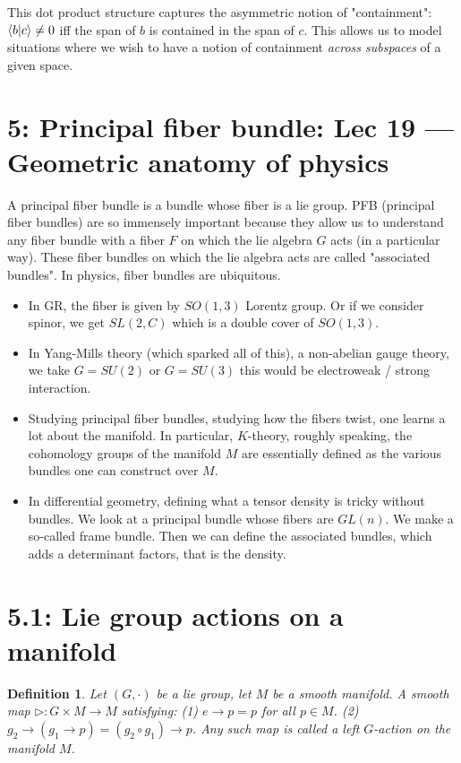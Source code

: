 \documentclass[11pt]{book}
\newtheorem{definition}[theorem]{Definition}
\begin{document}
This dot product structure captures the asymmetric notion of "containment":
$\braket{b}{c} \neq 0$ iff the span of $b$ is contained in the span of $c$.
This allows us to model situations where we wish to have a notion of containment
\emph{across subspaces} of a given space.

\section{5: Principal fiber bundle: Lec 19 --- Geometric anatomy of physics}

A principal fiber bundle is a bundle whose fiber is a lie group. PFB (principal
fiber bundles) are so immensely important because they allow us to understand
any fiber bundle with a fiber $F$ on which the lie algebra $G$ acts (in a particular way). 
These fiber bundles on which the lie algebra acts are called "associated bundles".
In physics, fiber bundles are ubiquitous. 

\begin{itemize}
\item In GR, the fiber is given by $SO(1, 3)$ Lorentz group. Or if we consider spinor, we get $SL(2, C)$
	which is a double cover of $SO(1, 3)$.
\item In Yang-Mills theory (which sparked all of this), a non-abelian gauge theory, we take
	  $G = SU(2)$ or $G = SU(3)$ this would be electroweak / strong interaction.
\item Studying principal fiber bundles, studying how the fibers twist, one learns a lot
     about the manifold. In particular, $K$-theory, roughly speaking, the cohomology groups
     of the manifold $M$ are essentially defined as the various bundles one can construct
    over $M$.
\item In differential geometry, defining what a tensor density is tricky without bundles.
      We look at a principal bundle whose fibers are $GL(n)$. We make a so-called frame bundle.
      Then we can define the associated bundles, which adds a determinant factors, that is the
      density.
\end{itemize}

\section{5.1: Lie group actions on a manifold}

\begin{definition}
Let $(G, \cdot)$ be a lie group, let $M$ be a smooth manifold. A smooth map
$\triangleright: G \times M \rightarrow M$ satisfying: (1) $e \rightarrow p = p$ for all $p \in M$.
(2) $g_2 \rightarrow (g_1 \rightarrow p) = (g_2 \circ g_1) \rightarrow  p$. Any such map is
called a left $G$-action on the manifold $M$.
\end{definition}
\end{document}
